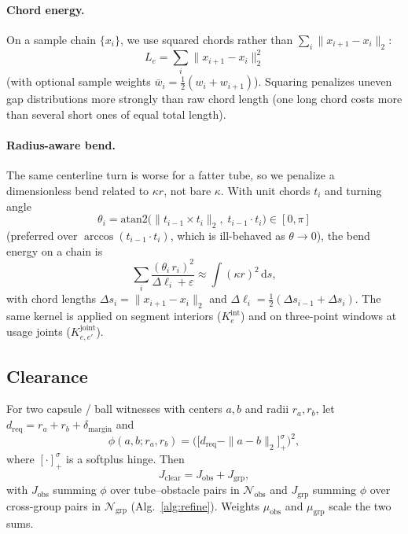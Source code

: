 \paragraph{Chord energy.}
On a sample chain $\{x_i\}$, we use squared chords rather than
$\sum_i\|x_{i+1}-x_i\|_2$:
\begin{equation}
L_e
=
\sum_{i}
\|x_{i+1}-x_i\|_2^{2}
\end{equation}
(with optional sample weights $\bar w_i=\tfrac12(w_i+w_{i+1})$).
Squaring penalizes uneven gap distributions more strongly than raw chord length
(one long chord costs more than several short ones of equal total length).

\paragraph{Radius-aware bend.}
The same centerline turn is worse for a fatter tube, so we penalize a
dimensionless bend related to $\kappa r$, not bare $\kappa$.
With unit chords $t_i$ and turning angle
\begin{equation}
\theta_i
=
\mathrm{atan2}\big(\|t_{i-1}\times t_i\|_2,\; t_{i-1}\cdot t_i\big)
\in[0,\pi]
\end{equation}
(preferred over $\arccos(t_{i-1}\cdot t_i)$, which is ill-behaved as
$\theta\!\to\!0$), the bend energy on a chain is
\begin{equation}
\label{eq:Kbend}
\sum_{i}
\frac{(\theta_i\, r_i)^{2}}{\Delta\ell_i+\varepsilon}
\approx
\int (\kappa r)^{2}\,\mathrm{d}s,
\end{equation}
with chord lengths $\Delta s_i=\|x_{i+1}-x_i\|_2$ and
$\Delta\ell_i=\tfrac12(\Delta s_{i-1}+\Delta s_i)$.
The same kernel is applied on segment interiors ($K_e^{\mathrm{int}}$) and on
three-point windows at usage joints ($K_{e,e'}^{\mathrm{joint}}$).

\subsection{Clearance}
\label{sec:costs:clear}

For two capsule / ball witnesses with centers $a,b$ and radii $r_a,r_b$, let
$d_{\mathrm{req}}=r_a+r_b+\delta_{\mathrm{margin}}$ and
\begin{equation}
\phi(a,b;r_a,r_b)
=
\Big(
\big[
d_{\mathrm{req}}-\|a-b\|_2
\big]_+^{\sigma}
\Big)^{2},
\end{equation}
where $[\cdot]_+^\sigma$ is a softplus hinge.
Then
\begin{equation}
J_{\mathrm{clear}}
=
J_{\mathrm{obs}}
+
J_{\mathrm{grp}},
\end{equation}
with $J_{\mathrm{obs}}$ summing $\phi$ over tube--obstacle pairs in
$\mathcal{N}_{\mathrm{obs}}$ and $J_{\mathrm{grp}}$ summing $\phi$ over
cross-group pairs in $\mathcal{N}_{\mathrm{grp}}$
(Alg.~\ref{alg:refine}).
Weights $\mu_{\mathrm{obs}}$ and $\mu_{\mathrm{grp}}$ scale the two sums.

